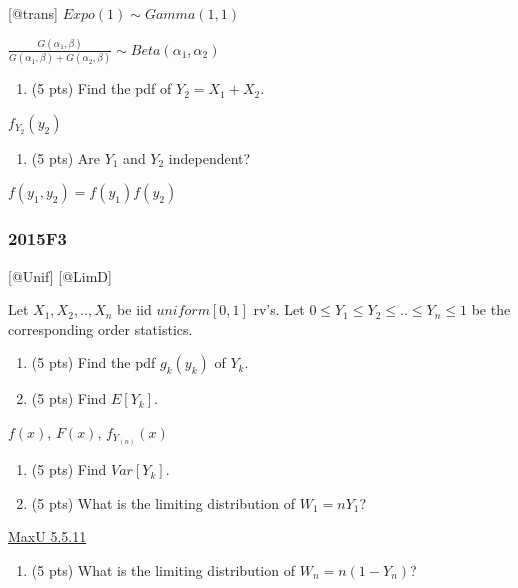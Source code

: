 \documentclass[6pt,Portrait]{article}
\providecommand{\tightlist}{%
  \setlength{\itemsep}{0pt}\setlength{\parskip}{0pt}}
\begin{document}
{[}@trans{]} \(Expo(1)\sim Gamma(1,1)\)

\(\frac{G(\alpha_1,\beta)}{G(\alpha_1,\beta)+G(\alpha_2,\beta)}\sim Beta(\alpha_1,\alpha_2)\)

\begin{enumerate}
\def\labelenumi{(\alph{enumi})}
\setcounter{enumi}{1}
\tightlist
\item
  (5 pts) Find the pdf of \(Y_2=X_1+X_2\).
\end{enumerate}

\(f_{Y_2}(y_2)\)

\begin{enumerate}
\def\labelenumi{(\alph{enumi})}
\setcounter{enumi}{2}
\tightlist
\item
  (5 pts) Are \(Y_1\) and \(Y_2\) independent?
\end{enumerate}

\(f(y_1,y_2)=f(y_1)f(y_2)\)

\hypertarget{f3-5}{%
\subsubsection{2015F3}\label{f3-5}}

{[}@Unif{]} {[}@LimD{]}

Let \(X_1,X_2,..,X_{n}\) be iid \(uniform[0,1]\) rv's. Let
\(0\le Y_1\le Y_2\le..\le Y_n\le1\) be the corresponding order
statistics.

\begin{enumerate}
\def\labelenumi{(\alph{enumi})}
\item
  (5 pts) Find the pdf \(g_k(y_k)\) of \(Y_k\).
\item
  (5 pts) Find \(E[Y_k]\).
\end{enumerate}

\(f(x)\), \(F(x)\), \(f_{Y_{(n)}}(x)\)

\begin{enumerate}
\def\labelenumi{(\alph{enumi})}
\setcounter{enumi}{2}
\item
  (5 pts) Find \(Var[Y_k]\).
\item
  (5 pts) What is the limiting distribution of \(W_1=nY_1\)?
\end{enumerate}

\protect\hyperlink{Max-Unif}{MaxU 5.5.11}

\begin{enumerate}
\def\labelenumi{(\alph{enumi})}
\setcounter{enumi}{4}
\tightlist
\item
  (5 pts) What is the limiting distribution of \(W_n=n(1-Y_n)\)?
\end{enumerate}
\end{document}
